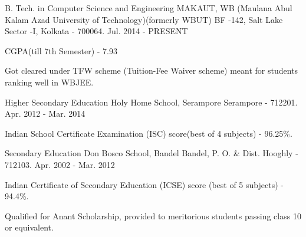 


\begin{cventries}


\cventry
{B. Tech.  in Computer Science and Engineering} %
{MAKAUT, WB (Maulana Abul Kalam Azad University of Technology)\newline (formerly WBUT)} %
{BF -142, Salt Lake Sector -I, \newline
Kolkata - 700064.} %
{Jul. 2014 - PRESENT} %
{ %
\begin{cvitems}
\item {CGPA(till 7th Semester) - 7.93}
\item {Got cleared under TFW scheme (Tuition-Fee Waiver scheme) meant for students ranking well in WBJEE.}
\end{cvitems}
}


\cventry
{Higher Secondary Education} %
{Holy Home School, Serampore} %
{Serampore - 712201.} %
{Apr. 2012 - Mar. 2014} %
{ %
\begin{cvitems}
\item {Indian School Certificate Examination (ISC) score(best of 4 subjects) - 96.25\%.}
\end{cvitems}
}


\cventry
{Secondary Education} %
{Don Bosco School, Bandel} %
{Bandel, P. O. \& Dist. Hooghly - 712103.} %
{Apr. 2002 - Mar. 2012} %
{ %
\begin{cvitems}
\item {Indian Certificate of Secondary Education (ICSE) score (best of 5 subjects) - 94.4\%.}
\item {Qualified for Anant Scholarship, provided to meritorious students passing class 10 or equivalent.}
\end{cvitems}
}


\end{cventries}